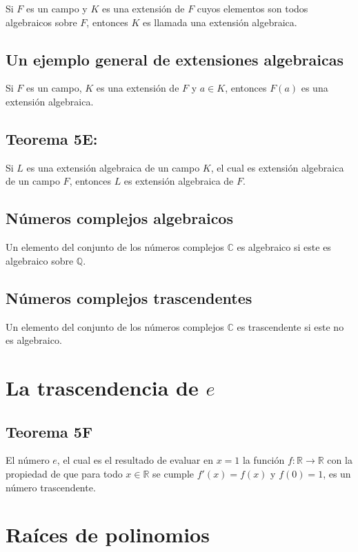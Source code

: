 \documentclass{article}
\begin{document}
Si $F$ es un campo y $K$ es una extensión de $F$ cuyos elementos son todos algebraicos sobre $F$, entonces $K$ es llamada una extensión algebraica.

\subsection*{\color{purple} Un ejemplo general de extensiones algebraicas}

Si $F$ es un campo, $K$ es una extensión de $F$ y $a\in K$, entonces $F(a)$ es una extensión algebraica.

\subsection*{\color{red} Teorema 5E:}

Si $L$ es una extensión algebraica de un campo $K$, el cual es extensión algebraica de un campo $F$, entonces $L$ es extensión algebraica de $F$.

\subsection*{\color{purple} Números complejos algebraicos}

Un elemento del conjunto de los números complejos $\mathbb{C}$ es algebraico si este es algebraico sobre $\mathbb{Q}$.

\subsection*{\color{purple} Números complejos trascendentes}

Un elemento del conjunto de los números complejos $\mathbb{C}$ es trascendente si este no es algebraico.

\section{La trascendencia de $e$}

\subsection*{\color{red} Teorema 5F}

El número $e$, el cual es el resultado de evaluar en $x=1$ la función $f:\mathbb{R}\to\mathbb{R}$ con la propiedad de que para todo $x\in\mathbb{R}$ se cumple $f'(x)=f(x)$ y $f(0)=1$, es un número trascendente.

\newpage
\section{Raíces de polinomios}
\end{document}
